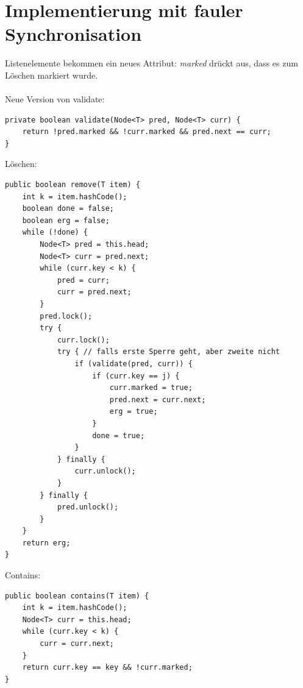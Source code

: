 \section{Implementierung mit fauler Synchronisation}
Listenelemente bekommen ein neues Attribut: \emph{marked} drückt aus, dass es zum Löschen markiert wurde.\\
\\
Neue Version von validate:
\begin{lstlisting}
private boolean validate(Node<T> pred, Node<T> curr) {
	return !pred.marked && !curr.marked && pred.next == curr;
}
\end{lstlisting}
Löschen:
\begin{lstlisting}
public boolean remove(T item) {
	int k = item.hashCode();
	boolean done = false;
	boolean erg = false;
	while (!done) {
		Node<T> pred = this.head;
		Node<T> curr = pred.next;
		while (curr.key < k) {
			pred = curr;
			curr = pred.next;
		}
		pred.lock();
		try {
			curr.lock();
			try { // falls erste Sperre geht, aber zweite nicht
				if (validate(pred, curr)) {
					if (curr.key == j) {
						curr.marked = true;
						pred.next = curr.next;
						erg = true;
					}
					done = true;
				}
			} finally {
				curr.unlock();
			}
		} finally {
			pred.unlock();
		}
	}
	return erg;
}
\end{lstlisting}

\pagebreak

Contains:
\begin{lstlisting}
public boolean contains(T item) {
	int k = item.hashCode();
	Node<T> curr = this.head;
	while (curr.key < k) {
		curr = curr.next;
	}
	return curr.key == key && !curr.marked;
}
\end{lstlisting}